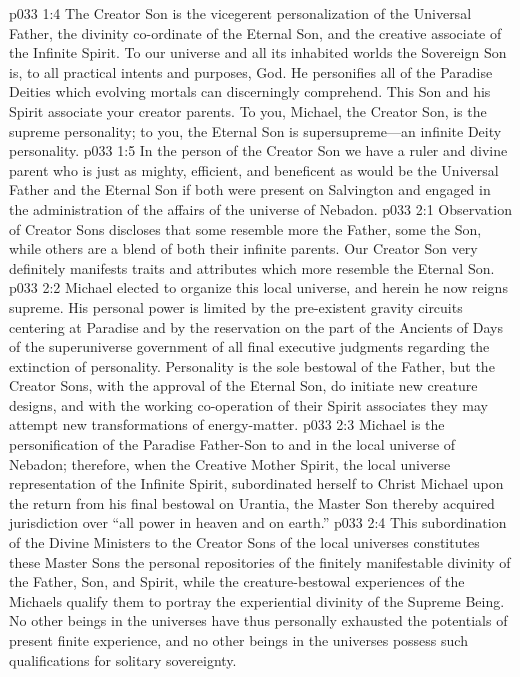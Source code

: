 \vs p033 1:4 The Creator Son is the vicegerent personalization of the Universal Father, the divinity co\hyp{}ordinate of the Eternal Son, and the creative associate of the Infinite Spirit. To our universe and all its inhabited worlds the Sovereign Son is, to all practical intents and purposes, God. He personifies all of the Paradise Deities which evolving mortals can discerningly comprehend. This Son and his Spirit associate  your creator parents. To you, Michael, the Creator Son, is the supreme personality; to you, the Eternal Son is supersupreme---an infinite Deity personality.\plusone
\pc \vs p033 1:5 In the person of the Creator Son we have a ruler and divine parent who is just as mighty, efficient, and beneficent as would be the Universal Father and the Eternal Son if both were present on Salvington and engaged in the administration of the affairs of the universe of Nebadon.
\vs p033 2:1 Observation of Creator Sons discloses that some resemble more the Father, some the Son, while others are a blend of both their infinite parents. Our Creator Son very definitely manifests traits and attributes which more resemble the Eternal Son.
\vs p033 2:2 Michael elected to organize this local universe, and herein he now reigns supreme. His personal power is limited by the pre\hyp{}existent gravity circuits centering at Paradise and by the reservation on the part of the Ancients of Days of the superuniverse government of all final executive judgments regarding the extinction of personality. Personality is the sole bestowal of the Father, but the Creator Sons, with the approval of the Eternal Son, do initiate new creature designs, and with the working co\hyp{}operation of their Spirit associates they may attempt new transformations of energy\hyp{}matter.
\pc \vs p033 2:3 Michael is the personification of the Paradise Father\hyp{}Son to and in the local universe of Nebadon; therefore, when the Creative Mother Spirit, the local universe representation of the Infinite Spirit, subordinated herself to Christ Michael upon the return from his final bestowal on Urantia, the Master Son thereby acquired jurisdiction over “all power in heaven and on earth.”
\vs p033 2:4 This subordination of the Divine Ministers to the Creator Sons of the local universes constitutes these Master Sons the personal repositories of the finitely manifestable divinity of the Father, Son, and Spirit, while the creature\hyp{}bestowal experiences of the Michaels qualify them to portray the experiential divinity of the Supreme Being. No other beings in the universes have thus personally exhausted the potentials of present finite experience, and no other beings in the universes possess such qualifications for solitary sovereignty.
